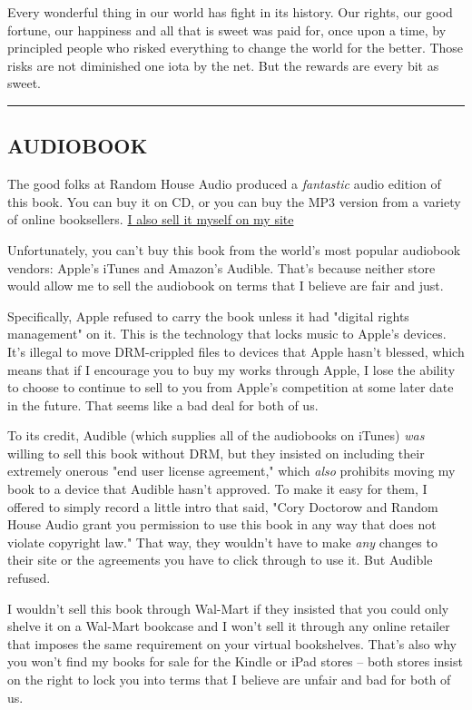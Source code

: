 Every wonderful thing in our world has fight in its history. Our
rights, our good fortune, our happiness and all that is sweet was
paid for, once upon a time, by principled people who risked
everything to change the world for the better. Those risks are not
diminished one iota by the net. But the rewards are every bit as
sweet.

\begin{center}\rule{3in}{0.4pt}\end{center}

\subsection{AUDIOBOOK}

The good folks at Random House Audio produced a \emph{fantastic}
audio edition of this book. You can buy it on CD, or you can buy
the MP3 version from a variety of online booksellers.
\href{http://craphound.com/?cat=10}{I also sell it myself on my site}

Unfortunately, you can't buy this book from the world's most
popular audiobook vendors: Apple's iTunes and Amazon's Audible.
That's because neither store would allow me to sell the audiobook
on terms that I believe are fair and just.

Specifically, Apple refused to carry the book unless it had
"digital rights management" on it. This is the technology that
locks music to Apple's devices. It's illegal to move DRM-crippled
files to devices that Apple hasn't blessed, which means that if I
encourage you to buy my works through Apple, I lose the ability to
choose to continue to sell to you from Apple's competition at some
later date in the future. That seems like a bad deal for both of
us.

To its credit, Audible (which supplies all of the audiobooks on
iTunes) \emph{was} willing to sell this book without DRM, but they
insisted on including their extremely onerous "end user license
agreement," which \emph{also} prohibits moving my book to a device
that Audible hasn't approved. To make it easy for them, I offered
to simply record a little intro that said, "Cory Doctorow and
Random House Audio grant you permission to use this book in any way
that does not violate copyright law." That way, they wouldn't have
to make \emph{any} changes to their site or the agreements you have
to click through to use it. But Audible refused.

I wouldn't sell this book through Wal-Mart if they insisted that
you could only shelve it on a Wal-Mart bookcase and I won't sell it
through any online retailer that imposes the same requirement on
your virtual bookshelves. That's also why you won't find my books
for sale for the Kindle or iPad stores -- both stores insist on the
right to lock you into terms that I believe are unfair and bad for
both of us.

